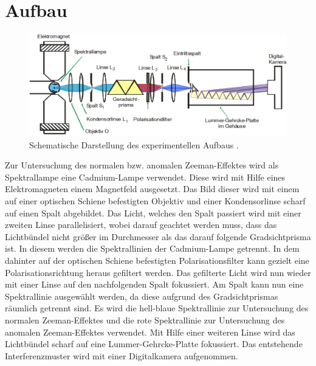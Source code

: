 \section{Aufbau}
\label{sec:Aufbau}
\begin{figure}
	\centering
	\includegraphics[width=\linewidth-50pt,height=\textheight-50pt,keepaspectratio]{content/Images/schema.png}
	\caption{Schematische Darstellung des experimentellen Aufbaus \cite{V27}.}
	\label{fig:schema}
\end{figure}

Zur Untersuchung des normalen bzw. anomalen Zeeman-Effektes wird als Spektrallampe eine Cadmium-Lampe verwendet. Diese wird mit Hilfe eines Elektromagneten einem Magnetfeld ausgesetzt. Das Bild dieser wird mit einem auf einer optischen Schiene befestigten Objektiv und einer Kondensorlinse scharf auf einen Spalt abgebildet. Das Licht, welches den Spalt passiert wird mit einer zweiten Linse parallelisiert, wobei darauf geachtet werden muss, dass das Lichtbündel nicht größer im Durchmesser als das darauf folgende Gradsichtprisma ist. In diesem werden die Spektrallinien der Cadmium-Lampe getrennt. In dem dahinter auf der optischen Schiene befestigten Polarisationsfilter kann gezielt eine Polarisationsrichtung heraus gefiltert werden. Das gefilterte Licht wird nun wieder mit einer Linse auf den nachfolgenden Spalt fokussiert. Am Spalt kann nun eine Spektrallinie ausgewählt werden, da diese aufgrund des Gradsichtprismas räumlich getrennt sind. Es wird die hell-blaue Spektrallinie zur Untersuchung des normalen Zeeman-Effektes und die rote Spektrallinie zur Untersuchung des anomalen Zeeman-Effektes verwendet. Mit Hilfe einer weiteren Linse wird das Lichtbündel scharf auf eine Lummer-Gehrcke-Platte fokussiert. Das entstehende Interferenzmuster wird mit einer Digitalkamera aufgenommen.